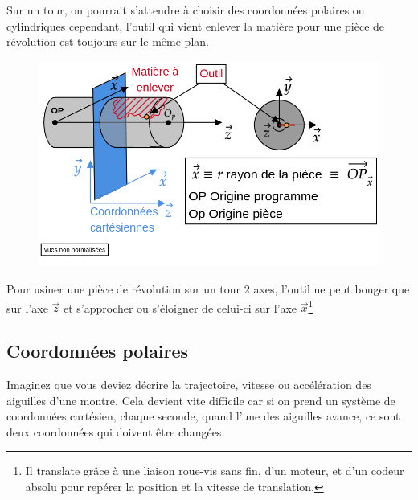 \documentclass[
	11pt, %
	fleqn, %
	a4paper, %
]{LegrandOrangeBook}
\begin{document}
\begin{remark}
    Sur un tour, on pourrait s'attendre à choisir des coordonnées polaires ou cylindriques cependant, l'outil qui vient enlever la matière pour une pièce de révolution est toujours sur le même plan.

    \begin{figure}[H] %
	\centering %
	\includegraphics[width=1\textwidth]{Images/coord1.png} %
\end{figure}

Pour usiner une pièce de révolution sur un tour 2 axes, l'outil ne peut bouger que sur l'axe $\Vec{z}$ et s'approcher ou s'éloigner de celui-ci sur l'axe $\Vec{x}$\footnote{Il translate grâce à une liaison roue-vis sans fin, d'un moteur, et d'un codeur absolu pour repérer la position et la vitesse de translation.}


\end{remark}


\subsection{Coordonnées polaires}
Imaginez que vous deviez décrire la trajectoire,  vitesse ou accélération des aiguilles d'une montre. Cela devient vite difficile car si on prend un système de coordonnées cartésien, chaque seconde, quand l'une des aiguilles avance, ce sont deux coordonnées qui doivent être changées. 
\end{document}

